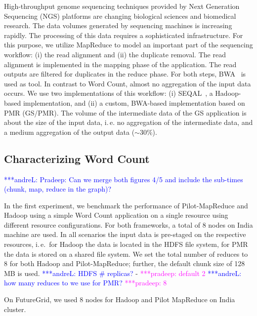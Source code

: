 \documentclass{acm_proc_article-sp}
\newcommand{\alnote}[1]{ {\textcolor{blue} { ***andreL: #1 }}}
\newcommand{\pnote}[1]{ {\textcolor{magenta} { ***pradeep: #1 }}}
\newcommand{\alnote}[1]{}
\newcommand{\pnote}[1]{}
\newcommand{\pilotmapreduce}{Pilot-MapReduce\xspace}
\begin{document}
High-throughput genome sequencing techniques provided by Next Generation
Sequencing (NGS) platforms are changing biological sciences and biomedical
research. The data volumes generated by sequencing machines is 
increasing rapidly. The processing of this data requires a sophisticated 
infrastructure. For this purpose, we utilize MapReduce to model an important 
part of the sequencing workflow: (i) the read alignment and (ii) the 
duplicate removal. The read alignment is implemented in the mapping phase of 
the application. The read outputs are filtered for duplicates in the reduce 
phase. For both steps, BWA~\cite{Li:2010:FAL:1741823.1741825} is used as tool. 
In contrast to Word Count, almost no aggregation of the input data occurs.
We use two implementations of this workflow: (i) SEQAL~\cite{seal-2011}, a 
Hadoop-based implementation, and (ii) a custom, BWA-based implementation based 
on PMR (GS/PMR). The volume of the intermediate data of the GS application is 
about the size of the input data, i.\,e. no aggregation of the intermediate 
data, and a medium aggregation of the output data ($\sim$30$\%$).


\subsection{Characterizing Word Count}
\alnote{Pradeep: Can we merge both figures 4/5 and include the sub-times (chunk, map, reduce in the graph)?}

In the first experiment, we benchmark the performance of \pilotmapreduce and Hadoop using a
simple Word Count application on a single resource using different resource configurations.
For both frameworks, a total of 8 nodes on India machine are used. In all scenarios the
input data is pre-staged on the respective resources, i.\,e.\ for Hadoop the data is
located in the HDFS file system, for PMR the data is stored on a shared file system. We set
the total number of reduces to 8 for both Hadoop and \pilotmapreduce; further, the default
chunk size of 128\,MB is used.\alnote{HDFS \# replicas?} - \pnote{default 2}\alnote{how
many reduces to we use for PMR?} \pnote{8}

On FutureGrid, we used 8 nodes for Hadoop and Pilot MapReduce on India cluster. 

\end{document}
